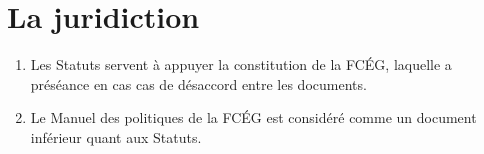 \section{La juridiction}
\label{la-juridiction}

\begin{enumerate}
 \item
  Les Statuts servent à appuyer la constitution de la FCÉG, laquelle a préséance en cas cas de désaccord entre les documents.
 \item
  Le Manuel des politiques de la FCÉG est considéré comme un document inférieur quant aux Statuts.
\end{enumerate}

